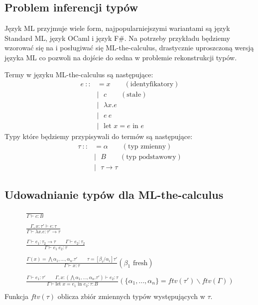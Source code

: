 \documentclass{article}
\begin{document}
\subsection{Problem inferencji typów}
Język ML przyjmuje wiele form, najpopularniejszymi wariantami są język Standard ML, język OCaml
i język F\#. Na potrzeby przykładu będziemy wzorować się na \cite{Damas__Milner__1982} i posługiwać się ML-the-calculus, drastycznie uproszczoną wersją języka ML co pozwoli na dojście do sedna w problemie rekonstrukcji typów.

Termy w języku ML-the-calculus są następujące:
\begin{equation}
  \begin{split}
    e\ ::&=x\qquad(\text{identyfikatory})\\
    &|\ \ \ c\qquad(\text{stałe})\\
    &|\ \ \ \lambda x.e\\
    &|\ \ \ e\ e\\
    &|\ \ \ \text{let }x=e\text{ in }e
  \end{split}
\end{equation}
Typy które będziemy przypisywali do termów są następujące:
\begin{equation}
  \begin{split}
    \tau\ ::&=\alpha\qquad(\text{typ zmienny})\\
    &|\ \ \ B\qquad(\text{typ podstawowy})\\
    &|\ \ \ \tau\rightarrow\tau
  \end{split}
\end{equation}
\subsection{Udowadnianie typów dla ML-the-calculus}

\begin{gather*}
    \frac{}{\Gamma\vdash c:B} \\
    \\
    \frac{\Gamma,x:\tau'\vdash e:\tau}{\Gamma\vdash\lambda x.e:\tau'\rightarrow\tau} \\
    \\
    \frac{\Gamma\vdash e_1:\tau_2\rightarrow\tau\qquad\Gamma\vdash e_2:\tau_2}{\Gamma\vdash e_1\ e_2:\tau} \\
    \\
    \frac{\Gamma(x)=\bigwedge\alpha_1,...,\alpha_n.\tau'\qquad\tau=[\beta_i/\alpha_i]\tau'}{\Gamma\vdash x:\tau}(\beta_1\text{ fresh}) \\
    \\
    \frac{\Gamma\vdash e_1:\tau'\qquad\Gamma,x:(\bigwedge\alpha_1,...,\alpha_n.\tau')\vdash e_2:\tau}{\Gamma\vdash \text{let }x=e_1\text{ in }e_2:\tau:B}(\{\alpha_1,...,\alpha_n\}=ftv(\tau')\backslash ftv(\Gamma)) \\
\end{gather*}
Funkcja $ftv(\tau)$ oblicza zbiór zmiennych typów występujących w $\tau$.
\end{document}
